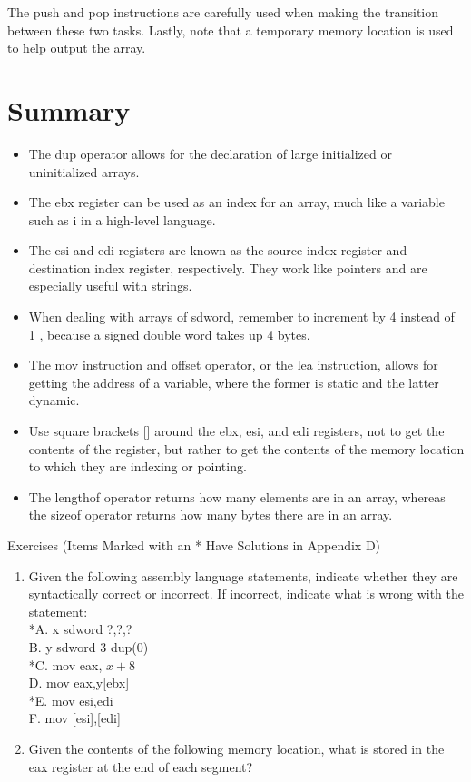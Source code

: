 \documentclass[10pt]{book}
\begin{document}
The push and pop instructions are carefully used when making the transition between these two tasks. Lastly, note that a temporary memory location is used to help output the array.


\section{Summary}
\begin{itemize}
  \item The dup operator allows for the declaration of large initialized or uninitialized arrays.
  \item The ebx register can be used as an index for an array, much like a variable such as i in a high-level language.
  \item The esi and edi registers are known as the source index register and destination index register, respectively. They work like pointers and are especially useful with strings.
  \item When dealing with arrays of sdword, remember to increment by 4 instead of 1 , because a signed double word takes up 4 bytes.
  \item The mov instruction and offset operator, or the lea instruction, allows for getting the address of a variable, where the former is static and the latter dynamic.
  \item Use square brackets [] around the ebx, esi, and edi registers, not to get the contents of the register, but rather to get the contents of the memory location to which they are indexing or pointing.
  \item The lengthof operator returns how many elements are in an array, whereas the sizeof operator returns how many bytes there are in an array.
\end{itemize}

Exercises (Items Marked with an * Have Solutions in Appendix D)
\begin{enumerate}
  \item Given the following assembly language statements, indicate whether they are syntactically correct or incorrect. If incorrect, indicate what is wrong with the statement:\\
*A. x sdword ?,?,?\\
B. y sdword 3 dup(0)\\
*C. mov eax, $x+8$\\[0pt]
D. mov eax,y[ebx]\\
*E. mov esi,edi\\[0pt]
F. mov [esi],[edi]
  \item Given the contents of the following memory location, what is stored in the eax register at the end of each segment?
\end{enumerate}
\end{document}
